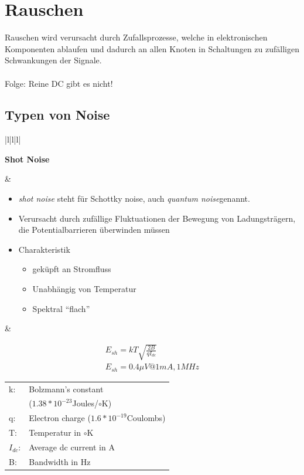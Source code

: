 \section{Rauschen}
Rauschen wird verursacht durch Zufallsprozesse, welche in elektronischen
Komponenten ablaufen und dadurch an allen Knoten in Schaltungen zu zufälligen
Schwankungen der Signale.\\
\\
Folge: Reine DC gibt es nicht!

\subsection{Typen von Noise}
\begin{longtable}{|l|l|l|}
\hline
\begin{minipage}{4cm}
\textbf{Shot Noise}
\end{minipage}
&
\begin{minipage}{6cm}
\begin{itemize}
  \item \textit{shot noise} steht für Schottky noise, auch \textit{quantum
  noise}genannt.
  \item Verursacht durch zufällige Fluktuationen der Bewegung von
  Ladungsträgern, die Potentialbarrieren überwinden müssen
  \item Charakteristik
  \begin{itemize}
    \item geküpft an Stromfluss
    \item Unabhängig von Temperatur
    \item Spektral "`flach"'
    \end{itemize}
\end{itemize}
\end{minipage}
&
\begin{minipage}{8cm}
\begin{gather}
E_{sh}=kT\sqrt{\frac{2B}{qI_{dc}}}\\
E_{sh}= 0.4\mu V @ 1mA,1MHz
\end{gather}
\begin{tabular}{ll}
k: &Bolzmann's constant\\&($1.38*10^{-23}$Joules/$\circ$K)\\
q:& Electron charge ($1.6*10^{-19}$Coulombs)\\
T:&Temperatur in $\circ$K\\
$I_{dc}$:& Average dc current in A\\
B:&Bandwidth in Hz
\end{tabular}

\end{minipage}
\end{longtable}

